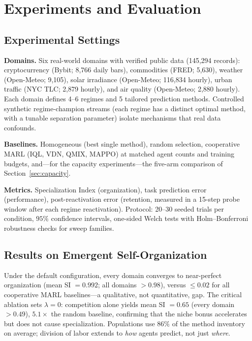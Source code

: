\documentclass[11pt]{article}
\begin{document}
\section{Experiments and Evaluation}
\label{sec:experiments}

\subsection{Experimental Settings}

\textbf{Domains.} Six real-world domains with verified public data
(145{,}294 records): cryptocurrency (Bybit; 8{,}766 daily bars), commodities
(FRED; 5{,}630), weather (Open-Meteo; 9{,}105), solar irradiance (Open-Meteo;
116{,}834 hourly), urban traffic (NYC TLC; 2{,}879 hourly), and air quality
(Open-Meteo; 2{,}880 hourly). Each domain defines 4--6 regimes and 5 tailored
prediction methods. Controlled synthetic regime-champion streams (each regime
has a distinct optimal method, with a tunable separation parameter) isolate
mechanisms that real data confounds.

\textbf{Baselines.} Homogeneous (best single method), random selection,
cooperative MARL (IQL, VDN, QMIX, MAPPO) at matched agent counts and training
budgets, and---for the capacity experiments---the five-arm comparison of
Section~\ref{sec:capacity}.

\textbf{Metrics.} Specialization Index (organization), task prediction error
(performance), post-reactivation error (retention, measured in a 15-step probe
window after each regime reactivation). Protocol: 20--30 seeded trials per
condition, $95\%$ confidence intervals, one-sided Welch tests with
Holm--Bonferroni robustness checks for sweep families.

\subsection{Results on Emergent Self-Organization}

Under the default configuration, every domain converges to near-perfect
organization (mean SI $= 0.992$; all domains $> 0.98$), versus $\le 0.02$ for
all cooperative MARL baselines---a qualitative, not quantitative, gap. The
critical ablation sets $\lambda = 0$: competition alone yields mean SI $= 0.65$
(every domain $> 0.49$), $5.1\times$ the random baseline, confirming that the
niche bonus accelerates but does not cause specialization. Populations use
$86\%$ of the method inventory on average; division of labor extends to
\emph{how} agents predict, not just \emph{where}.
\end{document}
